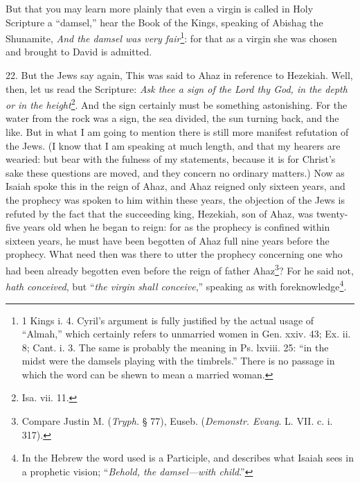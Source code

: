But that you may learn more plainly that even a virgin is called in Holy Scripture a “damsel,” hear the Book of the Kings, speaking of Abishag the Shunamite, \emph{And the damsel was very fair}\footnote{1 Kings i. 4. Cyril’s argument is fully justified by the actual usage of “Almah,” which certainly refers to unmarried women in Gen. xxiv. 43; Ex. ii. 8; Cant. i. 3. The same is probably the meaning in Ps. lxviii. 25: “in the midst were the damsels playing with the timbrels.” There is no passage in which the word can be shewn to mean a married woman.}: for that as a virgin she was chosen and brought to David is admitted.

22. But the Jews say again, This was said to Ahaz in reference to Hezekiah. Well, then, let us read the Scripture: \emph{Ask thee a sign of the Lord thy God, in the depth or in the height}\footnote{Isa. vii. 11.}. And the sign certainly must be something astonishing. For the water from the rock was a sign, the sea divided, the sun turning back, and the like. But in what I am going to mention there is still more manifest refutation of the Jews. (I know that I am speaking at much length, and that my hearers are wearied: but bear with the fulness of my statements, because it is for Christ’s sake these questions are moved, and they concern no ordinary matters.) Now as Isaiah spoke this in the reign of Ahaz, and Ahaz reigned only sixteen years, and the prophecy was spoken to him within these years, the objection of the Jews is refuted by the fact that the succeeding king, Hezekiah, son of Ahaz, was twenty-five years old when he began to reign: for as the prophecy is confined within sixteen years, he must have been begotten of Ahaz full nine years before the prophecy. What need then was there to utter the prophecy concerning one who had been already begotten even before the reign of father Ahaz\footnote{Compare Justin M. (\emph{Tryph.} § 77), Euseb. (\emph{Demonstr. Evang}. L. VII. c. i. 317).}? For he said not, \emph{hath conceived}, but “\emph{the virgin shall conceive},” speaking as with foreknowledge\footnote{In the Hebrew the word used is a Participle, and describes what Isaiah sees in a prophetic vision; “\emph{Behold, the damsel—with child}.”}.

